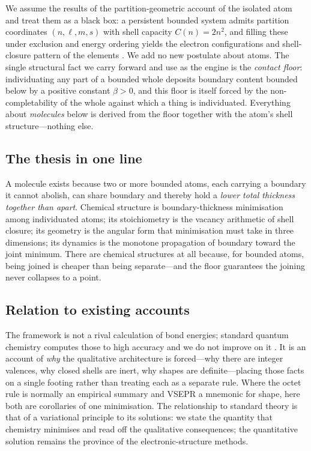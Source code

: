 \documentclass[11pt,a4paper]{article}
\theoremstyle{thmstyle}
\theoremstyle{definition}
\theoremstyle{remark}
\newcommand{\floorc}{\beta}
\newcommand{\Shellcap}{C}
\begin{document}
We assume the results of the partition-geometric account of the isolated
atom and treat them as a black box: a persistent bounded system admits
partition coordinates $(n,\ell,m,s)$ with shell capacity
$\Shellcap(n)=2n^{2}$, and filling these under exclusion and energy ordering
yields the electron configurations and shell-closure pattern of the
elements \citep{griffiths2018,pauli1925,madelung1936}. We add no new
postulate about atoms. The single structural fact we carry forward and
use as the engine is the \emph{contact floor}: individuating any part of
a bounded whole deposits boundary content bounded below by a positive
constant $\floorc>0$, and this floor is itself forced by the
non-completability of the whole against which a thing is
individuated. Everything about \emph{molecules} below is derived from
the floor together with the atom's shell structure---nothing else.

\subsection{The thesis in one line}

A molecule exists because two or more bounded atoms, each carrying a
boundary it cannot abolish, can share boundary and thereby hold a
\emph{lower total thickness together than apart}. Chemical structure is
boundary-thickness minimisation among individuated atoms; its
stoichiometry is the vacancy arithmetic of shell closure; its geometry is
the angular form that minimisation must take in three dimensions; its
dynamics is the monotone propagation of boundary toward the joint
minimum. There are chemical structures at all because, for bounded
atoms, being joined is cheaper than being separate---and the floor
guarantees the joining never collapses to a point.

\subsection{Relation to existing accounts}

The framework is not a rival calculation of bond energies; standard
quantum chemistry computes those to high accuracy and we do not improve
on it \citep{szabo1996,levine2014}. It is an account of \emph{why} the
qualitative architecture is forced---why there are integer valences, why
closed shells are inert, why shapes are definite---placing those facts on
a single footing rather than treating each as a separate rule. Where the
octet rule \citep{lewis1916,langmuir1919} is normally an empirical
summary and VSEPR \citep{gillespie1957} a mnemonic for shape, here both
are corollaries of one minimisation. The relationship to standard theory
is that of a variational principle to its solutions: we state the
quantity that chemistry minimises and read off the qualitative
consequences; the quantitative solution remains the province of the
electronic-structure methods.
\end{document}

